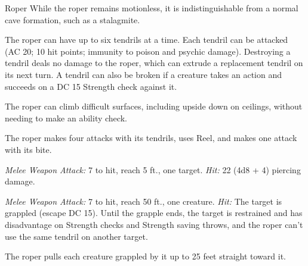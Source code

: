 \documentclass[10pt,a4paper,twoside,bg=print,twocolumn,openany,nodeprecatedcode]{dndbook}
\begin{document}
\begin{DndMonster}[float=t]{Roper}
\DndMonsterBasics[
armor-class = {20 (natural armor)},
hit-points = {\DndDice{11d10 + 33}},
speed = {10 ft., climb 10 ft.}
]
\DndMonsterAbilityScores[
 str = 18,
 dex = 8,
 con = 17,
 int = 7,
 wis = 16,
 cha = 6
]
\DndMonsterDetails[
skills = {Perception +6, Stealth +5},
senses = {darkvision 60 ft., passive perception 16},
challenge = 5,
]
While the roper remains motionless, it is indistinguishable from a normal cave formation, such as a stalagmite.

The roper can have up to six tendrils at a time. Each tendril can be attacked (AC 20; 10 hit points; immunity to poison and psychic damage). Destroying a tendril deals no damage to the roper, which can extrude a replacement tendril on its next turn. A tendril can also be broken if a creature takes an action and succeeds on a DC 15 Strength check against it.

The roper can climb difficult surfaces, including upside down on ceilings, without needing to make an ability check.

The roper makes four attacks with its tendrils, uses Reel, and makes one attack with its bite.

\textsl{Melee Weapon Attack:} 7 to hit, reach 5 ft., one target. \textsl{Hit:} 22 (4d8 + 4) piercing damage.

\textsl{Melee Weapon Attack:} 7 to hit, reach 50 ft., one creature. \textsl{Hit:} The target is grappled (escape DC 15). Until the grapple ends, the target is restrained and has disadvantage on Strength checks and Strength saving throws, and the roper can't use the same tendril on another target.

The roper pulls each creature grappled by it up to 25 feet straight toward it.

\end{DndMonster}
\end{document}
